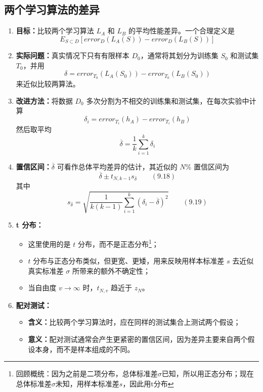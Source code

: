 \documentclass[../main.tex]{subfiles}
\begin{document}
\subsection{两个学习算法的差异}\label{sec:algorithm-comparison}
\begin{enumerate}
    \item \textbf{目标：}比较两个学习算法 $L_A$ 和 $L_B$ 的平均性能差异。一个合理定义是
    $$
    E_{S\subset D}\!\left[
    error_D\!\left(L_A(S)\right)-error_D\!\left(L_B(S)\right)
    \right]
    $$
    \item \textbf{实际问题：}真实情况下只有有限样本 $D_0$，通常将其划分为训练集 $S_0$ 和测试集 $T_0$，并用
    $$
    \delta=error_{T_0}\!\left(L_A(S_0)\right)-error_{T_0}\!\left(L_B(S_0)\right)
    $$
    来近似比较两算法。
    \item \textbf{改进方法：}将数据 $D_0$ 多次分割为不相交的训练集和测试集，在每次实验中计算
    $$
    \delta_i=error_{T_i}(h_A)-error_{T_i}(h_B)
    $$
    然后取平均
    $$
    \overline{\delta}=\frac{1}{k}\sum_{i=1}^k \delta_i
    $$
    \item \textbf{置信区间：}$\overline{\delta}$ 可看作总体平均差异的估计，其近似的 $N\%$ 置信区间为
    $$
    \overline{\delta}\pm t_{N,k-1}s_{\overline{\delta}}
    \qquad (9.18)
    $$
    其中
    $$
    s_{\overline{\delta}}=
    \sqrt{
    \frac{1}{k(k-1)}
    \sum_{i=1}^k (\delta_i-\overline{\delta})^2
    }
    \qquad (9.19)
    $$
    \item \textbf{t 分布：}
    \begin{itemize}
        \item 这里使用的是 $t$ 分布，而不是正态分布\footnote{回顾概统：因为之前是二项分布，总体标准差$\sigma$已知，所以用正态分布；现在总体标准差$\sigma$未知，用样本标准差$s$，因此用t分布}；
        \item $t$ 分布与正态分布类似，但更宽、更矮，用来反映用样本标准差 $s$ 去近似真实标准差 $\sigma$ 所带来的额外不确定性；
        \item 当自由度 $v\to\infty$ 时，$t_{N,v}$ 趋近于 $z_N$。
    \end{itemize}
    \item \textbf{配对测试：}
    \begin{itemize}
        \item \textbf{含义：}比较两个学习算法时，应在同样的测试集合上测试两个假设；
        \item \textbf{意义：}配对测试通常会产生更紧密的置信区间，因为差异主要来自两个假设本身，而不是样本组成的不同。
    \end{itemize}

\end{enumerate}
\end{document}
